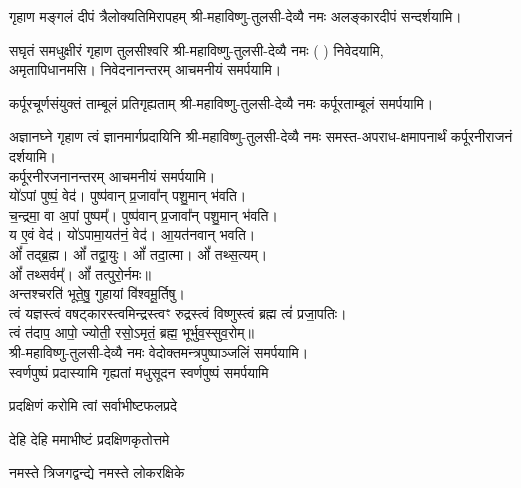 {गृहाण मङ्गलं दीपं त्रैलोक्यतिमिरापहम्}
श्री-महाविष्णु-तुलसी-देव्यै नमः अलङ्कारदीपं सन्दर्शयामि।

{सघृतं समधुक्षीरं गृहाण तुलसीश्वरि}
श्री-महाविष्णु-तुलसी-देव्यै नमः (	) निवेदयामि,\\
अमृतापिधानमसि। निवेदनानन्तरम् आचमनीयं समर्पयामि।

{कर्पूरचूर्णसंयुक्तं ताम्बूलं प्रतिगृह्यताम्}
श्री-महाविष्णु-तुलसी-देव्यै नमः कर्पूरताम्बूलं समर्पयामि।

{अज्ञानघ्ने गृहाण त्वं ज्ञानमार्गप्रदायिनि}
श्री-महाविष्णु-तुलसी-देव्यै नमः समस्त-अपराध-क्षमापनार्थं कर्पूरनीराजनं दर्शयामि।\\
कर्पूरनीरजनानन्तरम् आचमनीयं समर्पयामि।\\

यो॑ऽपां पुष्पं॒ वेद॑। पुष्प॑वान् प्र॒जावा᳚न् पशु॒मान् भ॑वति।\\
च॒न्द्रमा॒ वा अ॒पां पुष्पम्᳚। पुष्प॑वान् प्र॒जावा᳚न् पशु॒मान् भ॑वति।\\
य ए॒वं वेद॑। यो॑ऽपामा॒यत॑नं॒ वेद॑। आ॒यत॑नवान् भवति।\\

ओं᳚ तद्ब्र॒ह्म। ओं᳚ तद्वा॒युः। ओं᳚ तदा॒त्मा। ओं᳚ तथ्स॒त्यम्‌।\\
ओं᳚ तथ्सर्वम्᳚‌। ओं᳚ तत्पुरो॒र्नमः॥\\

अन्तश्चरति॑ भूते॒षु॒ गुहायां वि॑श्वमू॒र्तिषु।\\
त्वं यज्ञस्त्वं वषट्कारस्त्वमिन्द्रस्त्वꣳ रुद्रस्त्वं विष्णुस्त्वं ब्रह्म त्वं॑ प्रजा॒पतिः।\\
त्वं त॑दाप॒ आपो॒ ज्योती॒ रसो॒ऽमृतं॒ ब्रह्म॒ भूर्भुव॒स्सुव॒रोम्‌॥\\

श्री-महाविष्णु-तुलसी-देव्यै नमः वेदोक्तमन्त्रपुष्पाञ्जलिं समर्पयामि।\\

{स्वर्णपुष्पं प्रदास्यामि गृह्यतां मधुसूदन}
स्वर्णपुष्पं समर्पयामि

{प्रदक्षिणं करोमि त्वां सर्वाभीष्टफलप्रदे}

{देहि देहि ममाभीष्टं प्रदक्षिणकृतोत्तमे}

{नमस्ते त्रिजगद्वन्द्ये नमस्ते लोकरक्षिके}

